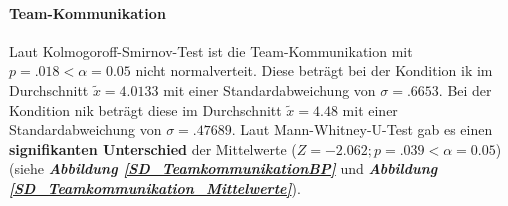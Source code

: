 \documentclass[a4paper,11pt]{article}%
\renewcommand{\\}{\vspace*{0.5\baselineskip} \newline}
\begin{document}
\paragraph{Team-Kommunikation} 
Laut Kolmogoroff-Smirnov-Test ist die Team-Kommunikation mit $p = .018 < \alpha = 0.05$ nicht normalverteit. 
Diese beträgt bei der Kondition \ac{ik} im Durchschnitt $\tilde x = 4.0133$ mit einer Standardabweichung von $\sigma = .6653$.
Bei der Kondition \ac{nik} beträgt diese im Durchschnitt $\tilde x = 4.48$ mit einer Standardabweichung von $\sigma = .47689$. 
Laut Mann-Whitney-U-Test gab es einen \textbf{signifikanten Unterschied} der Mittelwerte ($ Z = -2.062; p = .039 < \alpha = 0.05$) (siehe \textbf{\textit{Abbildung \ref{SD_TeamkommunikationBP}}} und \textbf{\textit{Abbildung \ref{SD_Teamkommunikation_Mittelwerte}}}).
\end{document}
